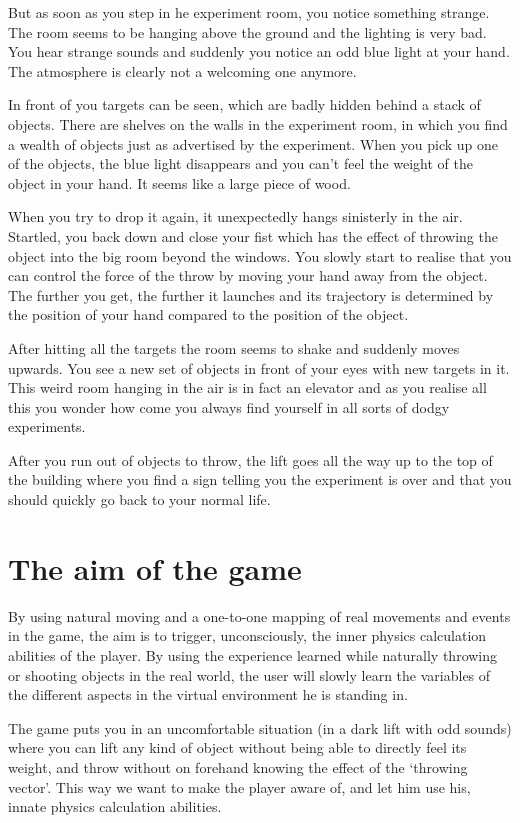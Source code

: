 \documentclass[a4paper]{article}
\begin{document}
But as soon as you step in he experiment room, you notice something strange. The
room seems to be hanging above the ground and the lighting is very bad. You hear
strange sounds and suddenly you notice an odd blue light at your hand. The
atmosphere is clearly not a welcoming one anymore.

In front of you targets can be seen, which are badly hidden behind a stack of objects.
There are shelves on the walls in the experiment room, in which you find a wealth of
objects just as advertised by the experiment. When you pick up one of the objects,
the blue light disappears and you can't feel the weight of the object in your hand.
It seems like a large piece of wood.

When you try to drop it again, it unexpectedly hangs sinisterly in the air. Startled, you back
down and close your fist which has the effect of throwing the object into the big room
beyond the windows. You slowly start to realise that you can control the force of the
throw by moving your hand away from the object. The further you get, the further
it launches and its trajectory is determined by the position of your hand
compared to the position of the object.

After hitting all the targets the room seems to shake and suddenly moves upwards.
You see a new set of objects in front of your eyes with new targets in it. This
weird room hanging in the air is in fact an elevator and as you realise all this
you wonder how come you always find yourself in all sorts of dodgy experiments.

After you run out of objects to throw, the lift goes all the way up to the top of
the building where you find a sign telling you the experiment is over and that you
should quickly go back to your normal life.


\section{The aim of the game}
\label{sec:aim}

By using natural moving and a one-to-one mapping of real movements and events in
the game, the aim is to trigger, unconsciously, the inner physics calculation
abilities of the player. By using the experience learned while naturally throwing
or shooting objects in the real world, the user will slowly learn the variables
of the different aspects in the virtual environment he is standing in.

The game puts you in an uncomfortable situation (in a dark lift with odd sounds)
where you can lift any kind of object without being able to directly feel its weight,
and throw without on forehand knowing the effect of the `throwing vector'. This way
we want to make the player aware of, and let him use his, innate physics calculation
abilities.
\end{document}
